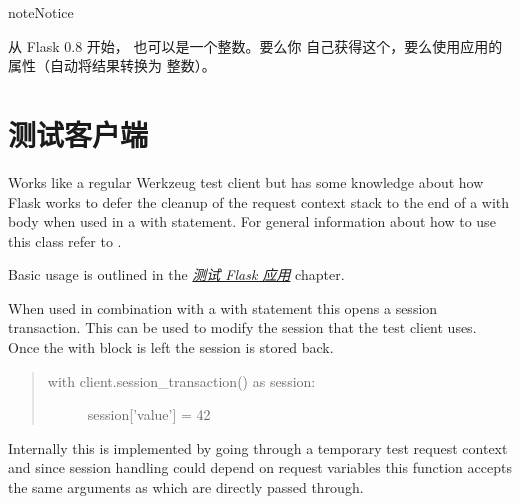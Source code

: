 \documentclass[a4paper,12pt]{sphinxmanual}
\begin{document}
\begin{notice}{note}{Notice}

从 Flask 0.8 开始，  也可以是一个整数。要么你
自己获得这个，要么使用应用的
{\hyperref[api:flask.Flask.permanent_session_lifetime]{}} 属性（自动将结果转换为
整数）。
\end{notice}


\section{测试客户端}
\label{api:id8}

\begin{fulllineitems}
\label{api:flask.testing.FlaskClient}
Works like a regular Werkzeug test client but has some knowledge about
how Flask works to defer the cleanup of the request context stack to the
end of a with body when used in a with statement.  For general information
about how to use this class refer to \href{http://werkzeug.pocoo.org/docs/test/\#werkzeug.test.Client}{}.

Basic usage is outlined in the {\hyperref[testing:testing]{\emph{测试 Flask 应用}}} chapter.

\begin{fulllineitems}
\label{api:flask.testing.FlaskClient.session_transaction}
When used in combination with a with statement this opens a
session transaction.  This can be used to modify the session that
the test client uses.  Once the with block is left the session is
stored back.
\begin{quote}
\begin{description}
\item[{with client.session\_transaction() as session:}] \leavevmode
session{[}'value'{]} = 42

\end{description}
\end{quote}

Internally this is implemented by going through a temporary test
request context and since session handling could depend on
request variables this function accepts the same arguments as
{\hyperref[api:flask.Flask.test_request_context]{}} which are directly
passed through.

\end{fulllineitems}


\end{fulllineitems}
\end{document}
